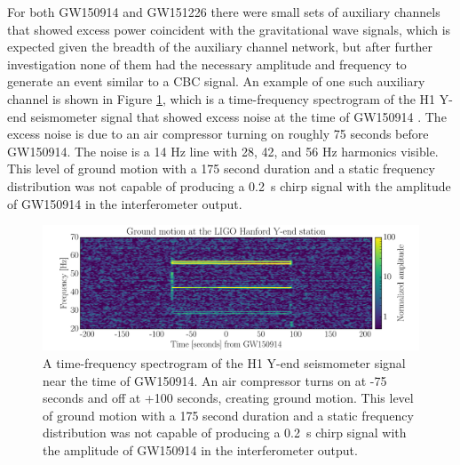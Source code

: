 For both GW150914 and GW151226 there were small sets of auxiliary channels 
that showed excess power coincident with the 
gravitational wave signals, which is expected given the breadth of the auxiliary 
channel network, but after further investigation none of them had the 
necessary amplitude and frequency to generate an event similar to a CBC 
signal. An example of one such auxiliary channel is shown in Figure \ref{fig:compressor}, 
which 
is a time-frequency spectrogram of the H1 Y-end seismometer signal that showed 
excess noise at the time of GW150914 \cite{GW150914-DETCHAR}. The excess 
noise is due to an air compressor turning on roughly 75 seconds before GW150914. 
The noise is a 14 Hz line with 28, 42, and 56 Hz harmonics visible. This level of 
ground motion with a 175 second duration and a static frequency distribution was 
not capable of producing a 0.2~s chirp signal with the amplitude of GW150914 in 
the interferometer output.

\begin{figure}
\includegraphics[width=\textwidth]{figures/detchar/H1_AIR_COMPRESSOR_GW150914}
\caption[H1 Y-end air compressor]{A time-frequency spectrogram of the H1 %
         Y-end seismometer signal near the time of GW150914. An air compressor %
         turns on at -75 seconds and off at +100 seconds, creating ground motion. %
         This level of ground motion with a 175 second duration and a static frequency %
         distribution was not capable of producing a 0.2~s chirp signal with the %
         amplitude of GW150914 in the interferometer output.}
\label{fig:compressor}
\end{figure}
